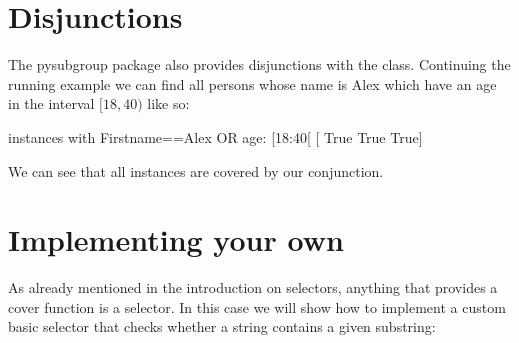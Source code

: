 \documentclass[letterpaper,10pt,english]{sphinxmanual}
\begin{document}
\section{Disjunctions}
\label{\detokenize{Selectors:disjunctions}}
The pysubgroup package also provides disjunctions with the  class. Continuing the running example we can find all persons whose name is Alex  which have an age in the interval \([18,40)\) like so:

\begin{sphinxVerbatim}[commandchars=\\\{\}]
  \PYG{p}{[} \PYG{p}{]}
  
\end{sphinxVerbatim}

\begin{sphinxVerbatim}[commandchars=\\\{\}]
instances with First\PYGZus{}name==\PYGZsq{}Alex\PYGZsq{} OR age: [18:40[ [ True  True  True]
\end{sphinxVerbatim}

We can see that all instances are covered by our conjunction.


\section{Implementing your own}
\label{\detokenize{Selectors:implementing-your-own}}
As already mentioned in the introduction on selectors, anything that provides a cover function is a selector. In this case we will show how to implement a custom basic selector that checks whether a string contains a given substring:
\end{document}
